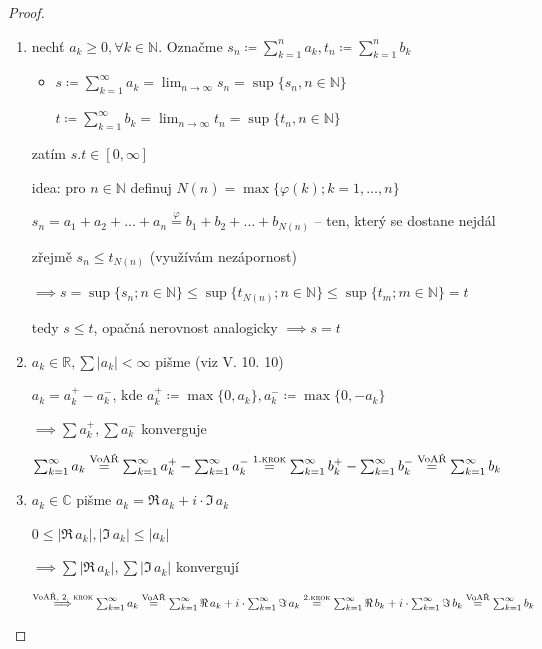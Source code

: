 \begin{proof}
  \begin{enumerate}[1. \textsc{krok}]
    \item nechť $a_k \geq 0, \forall k \in \mathbb N$. Označme $s_n \coloneq \sum_{k=1}^n a_k, t_n \coloneq \sum_{k=1}^n b_k$

    \begin{itemize}
      \item[$\stackrel{\text{L. 10. 2}}{\implies}$] $s\coloneq \sum_{k=1}^\infty a_k = \lim_{n\to \infty} s_n = \sup \{s_n,n\in \mathbb N\}$

      $t\coloneq \sum_{k=1}^\infty b_k = \lim_{n\to \infty} t_n = \sup \{t_n,n\in \mathbb N\}$
    \end{itemize}

    zatím $s.t \in [0, \infty]$

    idea: pro $n \in \mathbb N$ definuj $N(n) = \max\{\varphi(k); k = 1, \dots, n\}$

    $s_n = a_1 + a_2 + \dots + a_n \stackrel{\varphi}{=} b_1 + b_2 + \dots + b_{N(n)}$ -- ten, který se dostane nejdál

    zřejmě $s_n\leq t_{N(n)}$ (využívám nezápornost)

    $\implies s = \sup \{s_n; n \in \mathbb N\} \leq \sup \{t_{N(n)}; n\in \mathbb N\} \leq \sup \{t_m; m \in \mathbb N\} = t$

    tedy $s\leq t$, opačná nerovnost analogicky $\implies s=t$
    \item $a_k \in \mathbb R, \sum |a_k| <\infty$ pišme (viz V. 10. 10)

    $a_k = a_k^+-a_k^-$, kde $a_k^+\coloneq \max\{0, a_k\}, a_k^-\coloneq \max\{0, -a_k\}$

    $\implies \sum a_k^+, \sum a_k^-$ konverguje

    $\sum_{k=1}^\infty a_k \stackrel{\text{VoAŘ}}{=} \sum_{k=1}^\infty a_k^+ - \sum_{k=1}^\infty a_k^-\stackrel{1. \textsc{krok}}{=}\sum_{k=1}^\infty b_k^+-\sum_{k=1}^\infty b_k^-\stackrel{\text{VoAŘ}}{=}\sum_{k=1}^\infty b_k$
    \item $a_k \in \mathbb C$ pišme $a_k = \Re \, a_k +i\cdot \Im \, a_k$

    $0\leq|\Re \, a_k|, |\Im \, a_k| \leq |a_k|$

    $\implies \sum |\Re \, a_k|, \sum |\Im \, a_k|$ konvergují

    $\stackrel{\text{VoAŘ, 2. }\textsc{krok}}{\implies}\sum_{k=1}^\infty a_k \stackrel{\text{VoAŘ}}{=} \sum_{k=1}^\infty \Re \, a_k + i\cdot\sum_{k=1}^\infty \Im \, a_k\stackrel{2. \textsc{krok}}{=}\sum_{k=1}^\infty \Re \, b_k+i\cdot\sum_{k=1}^\infty \Im \, b_k\stackrel{\text{VoAŘ}}{=}\sum_{k=1}^\infty b_k$
  \end{enumerate}
\end{proof}

